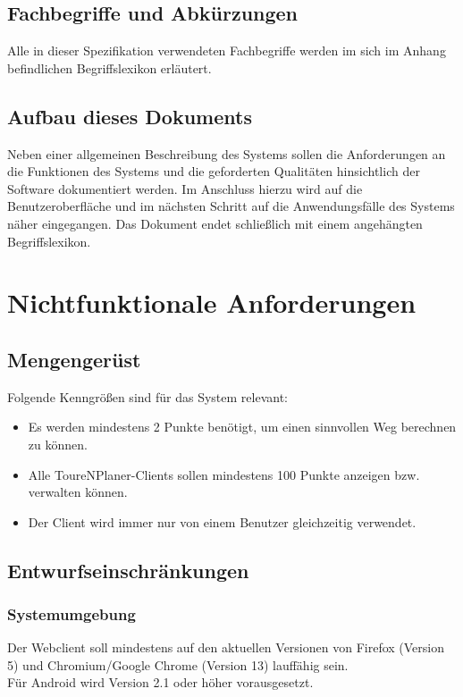 \documentclass[a4paper,10pt,titlepage]{article}
\begin{document}
\subsection{Fachbegriffe und Abkürzungen}

Alle in dieser Spezifikation verwendeten Fachbegriffe werden im sich im Anhang befindlichen Begriffslexikon erläutert.

\subsection{Aufbau dieses Dokuments}

Neben einer allgemeinen Beschreibung des Systems sollen die Anforderungen an die Funktionen des Systems und die geforderten Qualitäten hinsichtlich der Software dokumentiert werden. 
Im Anschluss hierzu wird auf die Benutzeroberfläche und im nächsten Schritt auf die Anwendungsfälle des Systems näher eingegangen. 
Das Dokument endet schließlich mit einem angehängten Begriffslexikon.

\section{Nichtfunktionale Anforderungen}

\subsection{Mengengerüst} \label{Mengengeruest}

Folgende Kenngrößen sind für das System relevant:
\begin{itemize}
\item Es werden mindestens 2 Punkte benötigt, um einen sinnvollen Weg berechnen zu können.
\item Alle ToureNPlaner-Clients sollen mindestens 100 Punkte anzeigen bzw. verwalten können.
\item Der Client wird immer nur von einem Benutzer gleichzeitig verwendet.
\end{itemize}

\subsection{Entwurfseinschränkungen}

\subsubsection{Systemumgebung} \label{sysumgebung}
Der Webclient soll mindestens auf den aktuellen Versionen von Firefox (Version 5) und Chromium/Google Chrome (Version 13) lauffähig sein.\\
Für Android wird Version 2.1 oder höher vorausgesetzt.
\end{document}
